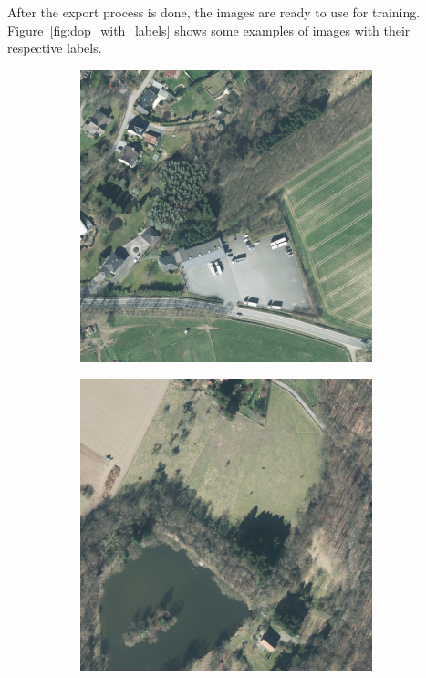 After the export process is done, the images are ready to use for training. Figure~\ref{fig:dop_with_labels} shows some examples of images with their respective labels.

\begin{figure}
    \newcommand{\DopLabelImageWidth}{0.23\textwidth}
    \centering
    \hfill
    \begin{subfigure}{\DopLabelImageWidth}
        \includegraphics[width=\textwidth]{images/186_image}
    \end{subfigure}
    \hfill
    \begin{subfigure}{\DopLabelImageWidth}
        \includegraphics[width=\textwidth]{images/583_image}

\end{subfigure}
\end{figure}
